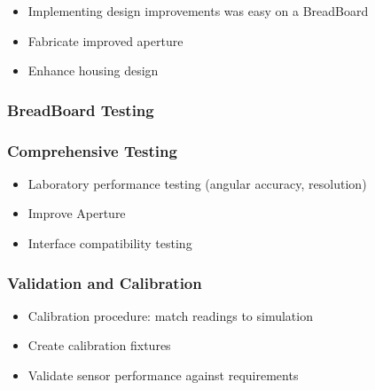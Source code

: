 \begin{itemize}
  \item Implementing design improvements was easy on a BreadBoard
  \item Fabricate improved aperture
  \item Enhance housing design
\end{itemize}


\subsubsection*{BreadBoard Testing}


\subsubsection*{Comprehensive Testing}
\begin{itemize}
  \item Laboratory performance testing (angular accuracy, resolution)
  \item Improve Aperture
  \item Interface compatibility testing
\end{itemize}

\subsubsection*{Validation and Calibration}
\begin{itemize}
  \item Calibration procedure: match readings to simulation
  \item Create calibration fixtures
  \item Validate sensor performance against requirements
\end{itemize}






